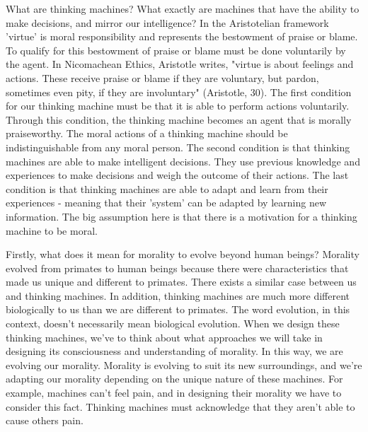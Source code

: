 \documentclass[11pt, oneside]{article}
\begin{document}
\par What are thinking machines? What exactly are machines that have the ability to make decisions, and mirror our intelligence? In the Aristotelian framework 'virtue' is moral responsibility and represents the bestowment of praise or blame. To qualify for this bestowment of praise or blame must be done voluntarily by the agent. In Nicomachean Ethics, Aristotle writes, "virtue is about feelings and actions. These receive praise or blame if they are voluntary, but pardon, sometimes even pity, if they are involuntary" (Aristotle, 30). The first condition for our thinking machine must be that it is able to perform actions voluntarily. Through this condition, the thinking machine becomes an agent that is morally praiseworthy. The moral actions of a thinking machine should be indistinguishable from any moral person. The second condition is that thinking machines are able to make intelligent decisions. They use previous knowledge and experiences to make decisions and weigh the outcome of their actions. The last condition is that thinking machines are able to adapt and learn from their experiences - meaning that their 'system' can be adapted by learning new information. The big assumption here is that there is a motivation for a thinking machine to be moral.
 
\par Firstly, what does it mean for morality to evolve beyond human beings? Morality evolved from primates to human beings because there were characteristics that made us unique and different to primates. There exists a similar case between us and thinking machines. In addition, thinking machines are much more different biologically to us than we are different to primates. The word evolution, in this context, doesn't necessarily mean biological evolution. When we design these thinking machines, we've to think about what approaches we will take in designing its consciousness and understanding of morality. In this way, we are evolving our morality. Morality is evolving to suit its new surroundings, and we're adapting our morality depending on the unique nature of these machines. For example, machines can't feel pain, and in designing their morality we have to consider this fact. Thinking machines must acknowledge that they aren't able to cause others pain.
 
\end{document}
